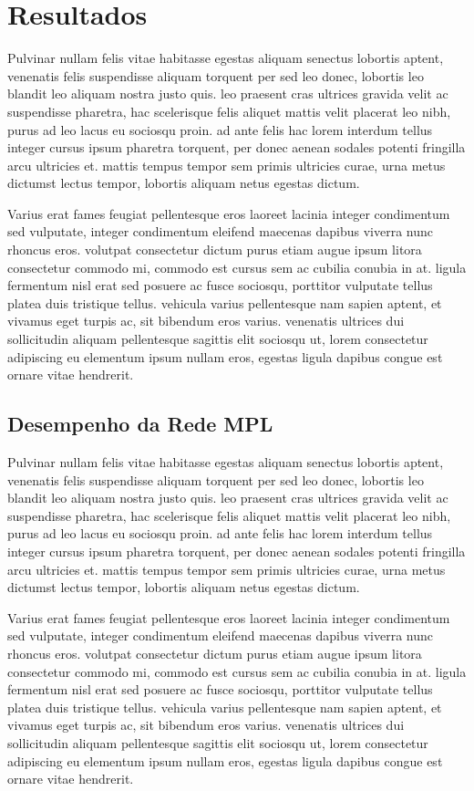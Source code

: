 \section{Resultados}

Pulvinar nullam felis vitae habitasse egestas aliquam senectus lobortis aptent, venenatis felis suspendisse aliquam torquent per sed leo donec, lobortis leo blandit leo aliquam nostra justo quis. leo praesent cras ultrices gravida velit ac suspendisse pharetra, hac scelerisque felis aliquet mattis velit placerat leo nibh, purus ad leo lacus eu sociosqu proin. ad ante felis hac lorem interdum tellus integer cursus ipsum pharetra torquent, per donec aenean sodales potenti fringilla arcu ultricies et. mattis tempus tempor sem primis ultricies curae, urna metus dictumst lectus tempor, lobortis aliquam netus egestas dictum.

Varius erat fames feugiat pellentesque eros laoreet lacinia integer condimentum sed vulputate, integer condimentum eleifend maecenas dapibus viverra nunc rhoncus eros. volutpat consectetur dictum purus etiam augue ipsum litora consectetur commodo mi, commodo est cursus sem ac cubilia conubia in at. ligula fermentum nisl erat sed posuere ac fusce sociosqu, porttitor vulputate tellus platea duis tristique tellus. vehicula varius pellentesque nam sapien aptent, et vivamus eget turpis ac, sit bibendum eros varius. venenatis ultrices dui sollicitudin aliquam pellentesque sagittis elit sociosqu ut, lorem consectetur adipiscing eu elementum ipsum nullam eros, egestas ligula dapibus congue est ornare vitae hendrerit.


\subsection{Desempenho da Rede MPL}

Pulvinar nullam felis vitae habitasse egestas aliquam senectus lobortis aptent, venenatis felis suspendisse aliquam torquent per sed leo donec, lobortis leo blandit leo aliquam nostra justo quis. leo praesent cras ultrices gravida velit ac suspendisse pharetra, hac scelerisque felis aliquet mattis velit placerat leo nibh, purus ad leo lacus eu sociosqu proin. ad ante felis hac lorem interdum tellus integer cursus ipsum pharetra torquent, per donec aenean sodales potenti fringilla arcu ultricies et. mattis tempus tempor sem primis ultricies curae, urna metus dictumst lectus tempor, lobortis aliquam netus egestas dictum.

Varius erat fames feugiat pellentesque eros laoreet lacinia integer condimentum sed vulputate, integer condimentum eleifend maecenas dapibus viverra nunc rhoncus eros. volutpat consectetur dictum purus etiam augue ipsum litora consectetur commodo mi, commodo est cursus sem ac cubilia conubia in at. ligula fermentum nisl erat sed posuere ac fusce sociosqu, porttitor vulputate tellus platea duis tristique tellus. vehicula varius pellentesque nam sapien aptent, et vivamus eget turpis ac, sit bibendum eros varius. venenatis ultrices dui sollicitudin aliquam pellentesque sagittis elit sociosqu ut, lorem consectetur adipiscing eu elementum ipsum nullam eros, egestas ligula dapibus congue est ornare vitae hendrerit.


